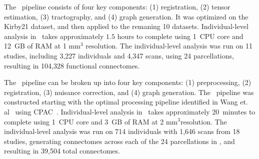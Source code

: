 \documentclass[11pt]{article}
\begin{document}

The \ndmgd~pipeline consists of four key components: (1) registration, (2) tensor estimation, (3) tractography, and (4) graph generation. It was optimized on the Kirby21 dataset, and then applied to the remaning 10 datasets.
Individual-level analysis in \ndmgd~takes approximately $1.5$ hours to complete using 1~CPU core and 12~GB of RAM at 1 mm$^3$ resolution.
The individual-level analysis was run on 11 studies, including 3,227 individuals and 4,347 scans, using 24 parcellations,  resulting in 104,328 functional connectomes.

The \ndmgf~pipeline can be broken up into four key components: (1) preprocessing, (2) registration, (3) nuisance correction, and (4) graph generation.
The \ndmgf~pipeline was constructed starting with the optimal processing pipeline identified in Wang et. al~\cite{discriminability} using CPAC~\cite{cpac}. 
Individual-level analysis in \ndmgf~takes approximately 20~minutes to complete using 1~CPU core and 3~GB of RAM at 2 mm$^3$resolution.
The individual-level analysis was run on 714 individuals with 1,646 scans from 18 studies, generating connectomes across each of the 24 parcellations in \ndmgd, and resulting in 39,504 total connectomes.



\end{document}
